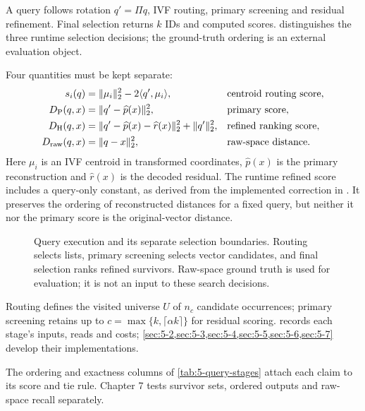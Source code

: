 A query follows rotation $q'=\Pi q$, IVF routing, primary screening and residual refinement. Final selection returns $k$ IDs and computed scores.  distinguishes the
three runtime selection decisions; the ground-truth ordering is an
external evaluation object.

Four quantities must be kept separate:
\begin{align}
 s_i(q)&=\|\mu_i\|_2^2-2\langle q',\mu_i\rangle,
                   &&\text{centroid routing score},\nonumber\\
 D_{\mathrm{P}}(q,x)&=\|q'-\widehat p(x)\|_2^2,
                   &&\text{primary score},\nonumber\\
 D_{\mathrm{H}}(q,x)&=\|q'-\widehat p(x)-\widehat r(x)\|_2^2
                       +\|q'\|_2^2,
                   &&\text{refined ranking score},\nonumber\\
 D_{\mathrm{raw}}(q,x)&=\|q-x\|_2^2,
                   &&\text{raw-space distance}.
 \label{eq:5-ranking-objects}
\end{align}
Here $\mu_i$ is an IVF centroid in transformed coordinates,
$\widehat p(x)$ is the primary reconstruction and $\widehat r(x)$ is
the decoded residual. The runtime refined score includes a query-only
constant, as derived from the implemented correction in .
It preserves the ordering of reconstructed distances for a fixed query,
but neither it nor the primary score is the original-vector distance.

\begin{figure}[tbp]
\centering

\caption[Query stages and selection boundaries]{Query execution and its separate selection boundaries. Routing
selects lists, primary screening selects vector candidates, and final
selection ranks refined survivors. Raw-space ground truth is used for
evaluation; it is not an input to these search decisions.}
\label{fig:5-query-path}
\end{figure}

Routing defines the visited universe $U$ of $n_c$ candidate occurrences;
primary screening retains up to $c=\max\{k,\lceil\alpha k\rceil\}$ for
residual scoring.  records each stage's inputs,
reads and costs; \cref{sec:5-2,sec:5-3,sec:5-4,sec:5-5,sec:5-6,sec:5-7}
develop their implementations.

The ordering and exactness columns of \cref{tab:5-query-stages}
attach each claim to its score and tie rule. Chapter 7 tests survivor
sets, ordered outputs and raw-space recall separately.


